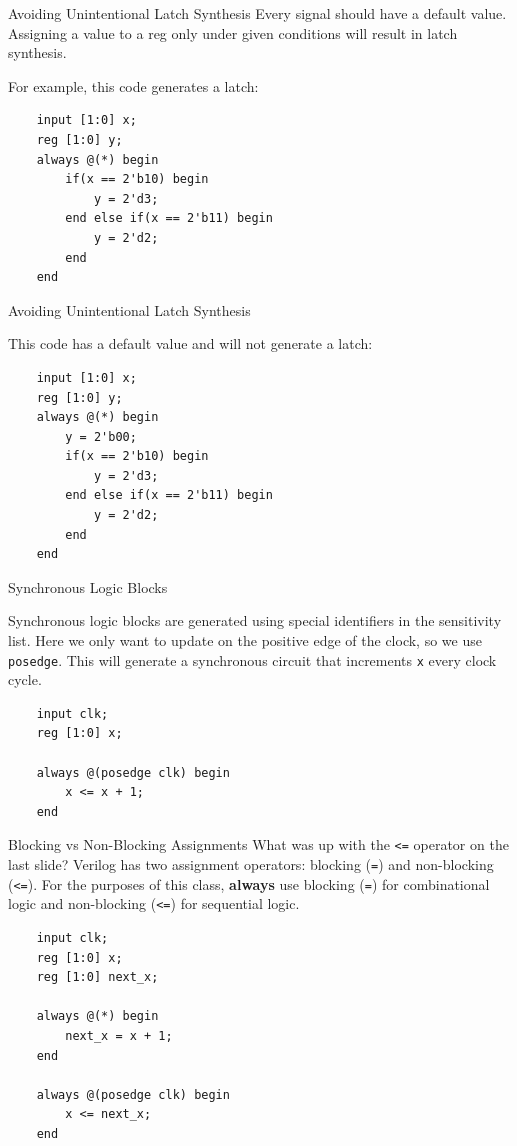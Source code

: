\documentclass{beamer}
\begin{document}
\begin{frame}[fragile]{Avoiding Unintentional Latch Synthesis}
	Every signal should have a default value.
	Assigning a value to a reg only under given conditions will result in latch synthesis.

	For example, this code generates a latch:

\begin{verbatim}
	input [1:0] x;
	reg [1:0] y;
	always @(*) begin
		if(x == 2'b10) begin
			y = 2'd3;
		end else if(x == 2'b11) begin
			y = 2'd2;
		end
	end
\end{verbatim}

\end{frame}

\begin{frame}[fragile]{Avoiding Unintentional Latch Synthesis}

	This code has a default value and will not generate a latch:

\begin{verbatim}
	input [1:0] x;
	reg [1:0] y;
	always @(*) begin
		y = 2'b00;
		if(x == 2'b10) begin
			y = 2'd3;
		end else if(x == 2'b11) begin
			y = 2'd2;
		end
	end
\end{verbatim}

\end{frame}

\begin{frame}[fragile]{Synchronous Logic Blocks}

	Synchronous logic blocks are generated using special identifiers in the sensitivity list.
	Here we only want to update on the positive edge of the clock, so we use \texttt{posedge}.
	This will generate a synchronous circuit that increments \texttt{x} every clock cycle.

\begin{verbatim}
	input clk;
	reg [1:0] x;

	always @(posedge clk) begin
		x <= x + 1;
	end
\end{verbatim}

\end{frame}

\begin{frame}[fragile]{Blocking vs Non-Blocking Assignments}
	What was up with the \texttt{<=} operator on the last slide?
	Verilog has two assignment operators: blocking (\texttt{=}) and non-blocking (\texttt{<=}).
	For the purposes of this class, \textbf{always} use blocking (\texttt{=}) for combinational logic and non-blocking (\texttt{<=}) for sequential logic.

\begin{verbatim}
	input clk;
	reg [1:0] x;
	reg [1:0] next_x;

	always @(*) begin
		next_x = x + 1;
	end

	always @(posedge clk) begin
		x <= next_x;
	end
\end{verbatim}

\end{frame}
\end{document}

